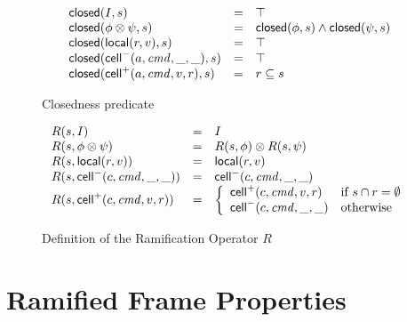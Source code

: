 \begin{figure}
\mbox{}
  \begin{displaymath}
    \begin{array}{lcl}
      \mathsf{closed}({I}, {s}) & = & \top \\
      \mathsf{closed}({\phi \otimes \psi}, {s}) & = & \mathsf{closed}({\phi}, {s}) \land \mathsf{closed}({\psi}, {s}) \\ 
      \mathsf{closed}({\mathsf{local}({r}, {v})}, {s}) & = & \top \\
      \mathsf{closed}({\mathsf{cell}^{-}({a}, {\mathit{cmd}}, {\_}, {\_})}, {s}) & = & \top \\
      \mathsf{closed}({\mathsf{cell}^{+}({a}, {\mathit{cmd}}, {v}, {r})}, {s}) & = & r \subseteq s \\
    \end{array}
  \end{displaymath}
\caption{Closedness predicate}
\label{closedness}  
\end{figure}

\begin{figure}
\mbox{}
  \begin{displaymath}
    \begin{array}{lcl}
      R(s, I)                 & = & I \\
      R(s, \phi \otimes \psi) & = & R(s, \phi) \otimes R(s, \psi) \\
      R(s, \mathsf{local}({r}, {v}))   & = & \mathsf{local}({r}, {v}) \\
      R(s, \mathsf{cell}^{-}({c}, {\mathit{cmd}}, {\_}, {\_}))    & = & \mathsf{cell}^{-}({c}, {\mathit{cmd}}, {\_}, {\_}) \\
      R(s, \mathsf{cell}^{+}({c}, {\mathit{cmd}}, {v}, {r})) & = & \left\{\begin{array}{ll}
                                                \mathsf{cell}^{+}({c}, {\mathit{cmd}}, {v}, {r}) 
                                              & \mbox{if } s \cap r = \emptyset \\
                                                \mathsf{cell}^{-}({c}, {\mathit{cmd}}, {\_}, {\_})
                                              & \mbox{otherwise}
                                              \end{array}
                                       \right.
    \end{array}
  \end{displaymath}
\caption{Definition of the Ramification Operator $R$}
\label{ramify-def}
\end{figure}

\section{Ramified Frame Properties}

